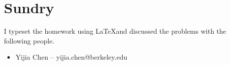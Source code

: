 \documentclass[11pt]{article}
\begin{document}
\section*{Sundry}

\begin{Answer}
    I typeset the homework using \LaTeX and discussed the problems with the following people.
    \begin{itemize}
        \item Yijia Chen -- yijia.chen@berkeley.edu
    \end{itemize}
\end{Answer}
\end{document}
